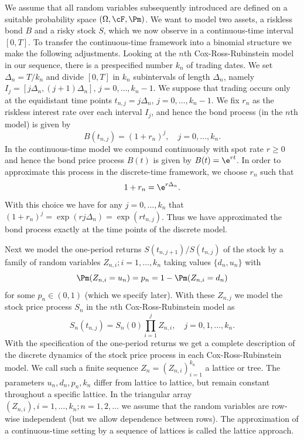 We assume that all random variables subsequently introduced are defined on a suitable probability space $(\Omega, \cF, \Pm)$. We want to model two assets, a riskless bond $B$ and a risky stock $S$, which we now observe in a continuous-time interval $[0, T]$. To transfer the continuous-time framework into a binomial structure we make the following adjustments. Looking at the $n$th Cox-Ross-Rubinstein model in our sequence, there is a prespecified number $k_n$ of trading dates. We set $\Delta_n = T/k_n$ and divide $[0, T]$ in $k_n$ subintervals of length $\Delta_n$, namely $I_j = [j\Delta_n, (j+1)\Delta_n]$, $j=0, \dots, k_n - 1$. We suppose that trading occurs only at the equidistant time points $t_{n,j} = j\Delta_n$, $j=0, \dots, k_n - 1$. We fix $r_n$ as the riskless interest rate over each interval $I_j$, and hence the bond process (in the $n$th model) is given by
\[
	B(t_{n,j}) = (1+r_n)^j, \quad j=0, \dots, k_n.
\]
In the continuous-time model we compound continuously with spot rate $r \geq 0$ and hence the bond price process $B(t)$ is given by $B(t) = \e^{rt}$. In order to approximate this process in the discrete-time framework, we choose $r_n$ such that
\begin{equation} \label{eq:RateApproximation}
	1 + r_n = \e^{r\Delta_n}.
\end{equation}
With this choice we have for any $j=0, \dots, k_n$ that $(1+r_n)^j = \exp(rj\Delta_n) = \exp(rt_{n,j})$. Thus we have approximated the bond process exactly at the time points of the discrete model.

Next we model the one-period returns $S(t_{n,j+1})/S(t_{n,j})$ of the stock by a family of random variables $Z_{n,i}; i=1, \dots, k_n$ taking values $\{d_n, u_n\}$ with
\[
	\Pm(Z_{n,i} = u_n) = p_n = 1 - \Pm(Z_{n,i} = d_n)
\]
for some $p_n \in (0, 1)$ (which we specify later). With these $Z_{n,j}$ we model the stock price process $S_n$ in the $n$th Cox-Ross-Rubinstein model as
\[
	S_n(t_{n,j}) = S_n(0) \prod_{i=1}^j Z_{n,i}, \quad j=0, 1, \dots, k_n.
\]
With the specification of the one-period returns we get a complete description of the discrete dynamics of the stock price process in each Cox-Ross-Rubinstein model. We call such a finite sequence $Z_n = (Z_{n,i})_{i=1}^{k_n}$ a lattice or tree. The parameters $u_n, d_n, p_n, k_n$ differ from lattice to lattice, but remain constant throughout a specific lattice. In the triangular array $(Z_{n,i}), i=1, \dots, k_n; n=1, 2, \dots$ we assume that the random variables are row-wise independent (but we allow dependence between rows). The approximation of a continuous-time setting by a sequence of lattices is called the lattice approach.

